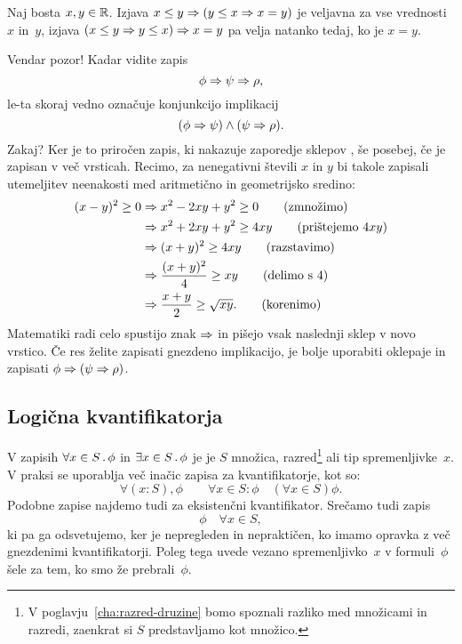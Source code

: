 \begin{zgled}
  Naj bosta $x, y \in \mathbb{R}$. Izjava $x \leq y \Rightarrow (y \leq x \Rightarrow x = y)$ je veljavna za vse vrednosti~$x$ in~$y$,
  izjava $(x \leq y \Rightarrow y \leq x) \Rightarrow x = y$ pa velja natanko tedaj, ko je $x = y$.
\end{zgled}

Vendar pozor! Kadar vidite zapis
%
\begin{equation*}
  \phi \Rightarrow \psi \Rightarrow \rho,
\end{equation*}
%
le-ta skoraj vedno označuje konjunkcijo implikacij
%
\begin{equation*}
  (\phi \Rightarrow \psi) \land (\psi \Rightarrow \rho).
\end{equation*}
%
Zakaj? Ker je to priročen zapis, ki nakazuje zaporedje sklepov
, še posebej,
če je zapisan v več vrsticah. Recimo, za nenegativni števili $x$ in
$y$ bi takole zapisali utemeljitev neenakosti med aritmetično in
geometrijsko sredino:
%
\begin{align*}
  (x - y)^2 \geq 0
  &\Rightarrow x^2 - 2 x y + y^2 \geq 0
  \tag{zmnožimo}\\
  &\Rightarrow x^2 + 2 x y + y^2 \geq 4 x y
  \tag{prištejemo $4 x y$}\\
  &\Rightarrow (x + y)^2 \geq 4 x y
  \tag{razstavimo}\\
  &\Rightarrow \frac{(x + y)^2}{4} \geq x y
  \tag{delimo s $4$}\\
  &\Rightarrow \frac{x+y}{2} \geq \sqrt{x y}.
  \tag{korenimo}
\end{align*}
%
Matematiki radi celo spustijo znak $\Rightarrow$ in pišejo vsak naslednji sklep v novo vrstico.
%
Če res želite zapisati gnezdeno implikacijo, je bolje uporabiti oklepaje in zapisati $\phi \Rightarrow (\psi
\Rightarrow \rho)$.


\subsection{Logična kvantifikatorja}
\label{sec:logina-kvant}

V zapisih $\forall x \in S \,.\, \phi$ in $\exists x \in S \,.\, \phi$ je je $S$ množica, razred\footnote{V poglavju~\ref{cha:razred-druzine} bomo spoznali razliko med množicami in razredi, zaenkrat si $S$
  predstavljamo kot množico.} ali tip spremenljivke~$x$. V praksi se
uporablja več inačic zapisa za kvantifikatorje, kot so:
%
\begin{equation*}
  \forall (x : S) , \phi
  \qquad
  \forall x \in S : \phi
  \quad
  (\forall x \in S) \phi.
\end{equation*}
%
Podobne zapise najdemo tudi za eksistenčni kvantifikator.
%
Srečamo tudi zapis
%
\begin{equation*}
  \phi\quad \forall x \in S,
\end{equation*}
%
ki pa ga odsvetujemo, ker je nepregleden in nepraktičen, ko imamo opravka z več gnezdenimi kvantifikatorji.
%
Poleg tega uvede vezano spremenljivko~$x$ v formuli~$\phi$ šele za tem, ko smo že prebrali~$\phi$.

